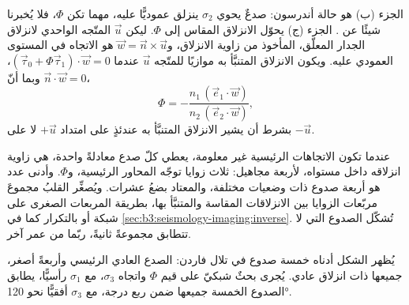 الجزء (ب) هو حالة أندرسون: صدعٌ يحوي $\sigma_2$ ينزلق
عموديًّا عليه، مهما تكن $\Phi$، فلا يُخبرنا شيئًا عن . الجزء (ج) يحوّل الانزلاق المقاس إلى $\Phi$. ليكن $\vec u$ المتّجه الواحدي
لانزلاق الجدار المعلّق، المأخوذ من زاوية الانزلاق، و$\vec w = \vec n\times\vec
u$ هو الاتجاه في المستوى العمودي عليه. ويكون الانزلاق المتنبَّأ به
موازيًا للمتّجه $\vec u$ عندما $(\vec\tau_0 + \Phi\vec\tau_1)\cdot\vec w = 0$،
وبما أنّ $\vec n\cdot\vec w = 0$،
\[
  \Phi = -\frac{n_1\,(\vec e_1\cdot\vec w)}{n_2\,(\vec e_2\cdot\vec w)} ,
\]
بشرط أن يشير الانزلاق المتنبَّأ به عندئذٍ على امتداد $+\vec u$ لا على $-\vec u$.

عندما تكون الاتجاهات الرئيسية غير معلومة، يعطي كلّ صدع معادلةً واحدة،
هي زاوية انزلاقه داخل مستواه، لأربعة مجاهيل: ثلاث زوايا توجّه
المحاور الرئيسية، و$\Phi$. وأدنى عدد هو أربعة صدوع ذات وضعيات مختلفة،
والمعتاد بضعُ عشرات. ويُصغِّر القلبُ مجموعَ
مربّعات الزوايا بين الانزلاقات المقاسة والمتنبَّأ بها، بطريقة المربعات الصغرى
على شبكة أو بالتكرار كما في \cref{sec:b3:seismology-imaging:inverse}.
تُشكّل الصدوع التي لا تتطابق مجموعةً ثانيةً، ربّما من عمر آخر.

يُظهر الشكل أدناه خمسة صدوع في تلال فاردن: الصدع العادي الرئيسي
وأربعةً أصغر، جميعها ذات انزلاق عادي. يُجرى بحثٌ شبكيّ على قيم $\Phi$
واتجاه $\sigma_3$، مع $\sigma_1$ رأسيًّا، يطابق الصدوع الخمسة جميعها ضمن ربع
درجة، مع $\sigma_3$ أفقيًّا نحو \ang{120}.

